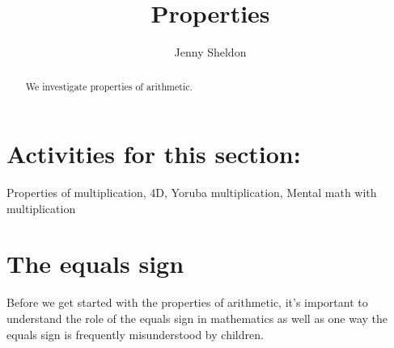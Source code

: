 \documentclass{ximera}
\title{Properties}
\author{Jenny Sheldon}
\begin{document}
\begin{abstract}
We investigate properties of arithmetic.
\end{abstract}
\maketitle

\section{Activities for this section:} Properties of multiplication, 4D, Yoruba multiplication, Mental math with multiplication

\section{The equals sign}

Before we get started with the properties of arithmetic, it's important to understand the role of the equals sign in mathematics as well as one way the equals sign is frequently misunderstood by children. 
\end{document}
